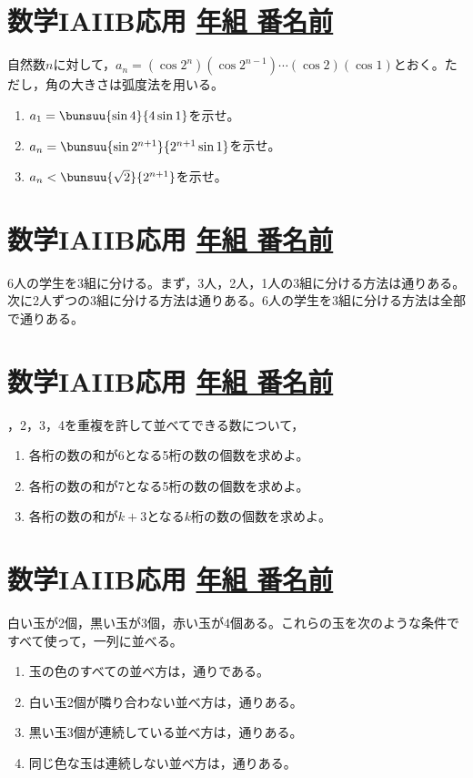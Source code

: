 \documentclass[b5j]{jarticle}
\def\Name#1{\section{\large\bf  #1\hfill
\underline{ \hspace{1zw}年\hspace{2zw}組\hspace{2zw}
番名前\hspace{12zw}}}}
\begin{document}
\newpage



\Name{数学IAIIB応用}
\hakosyokika
自然数$n$に対して，$a_{n}=(\cos2^{n})(\cos2^{n-1})\cdots(\cos2)(\cos1)$とおく。ただし，角の大きさは弧度法を用いる。
\begin{enumerate}
\item $a_{1}=\bunsuu{\sin4}{4\sin1}$を示せ。
\item $a_{n}=\bunsuu{\sin2^{n+1}}{2^{n+1}\sin1}$を示せ。
\item $a_{n}<\bunsuu{\sqrt 2}{2^{n+1}}$を示せ。
\end{enumerate}

\newpage





\Name{数学IAIIB応用}
\hakosyokika
6人の学生を3組に分ける。まず，3人，2人，1人の3組に分ける方法は\Hako 通りある。次に2人ずつの3組に分ける方法は\Hako 通りある。6人の学生を3組に分ける方法は全部で\Hako 通りある。

\newpage


\Name{数学IAIIB応用}
，2，3，4を重複を許して並べてできる数について，
\begin{enumerate}

\item 各桁の数の和が6となる5桁の数の個数を求めよ。

\item 各桁の数の和が7となる5桁の数の個数を求めよ。

\item 各桁の数の和が$k+3$となる$k$桁の数の個数を求めよ。



\end{enumerate}

\newpage

\Name{数学IAIIB応用}
\hakosyokika

白い玉が2個，黒い玉が3個，赤い玉が4個ある。これらの玉を次のような条件ですべて使って，一列に並べる。
\begin{enumerate}
\item 玉の色のすべての並べ方は，\Hako 通りである。
\item 白い玉2個が隣り合わない並べ方は，\Hako 通りある。
\item 黒い玉3個が連続している並べ方は，\Hako 通りある。
\item 同じ色な玉は連続しない並べ方は，\Hako 通りある。


\end{enumerate}
\end{document}
